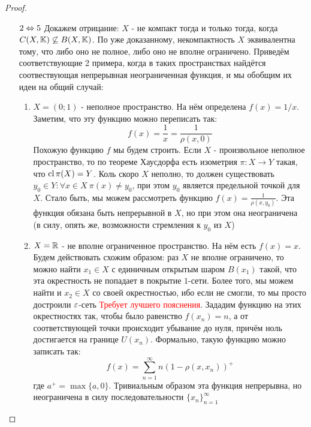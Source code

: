 \begin{proof}
\begin{enumerate}
		\item[$2 \Leftrightarrow 5$] Докажем отрицание: $X$ - не компакт тогда и только тогда, когда $C(X, \K) \centernot\subseteq B(X, \K)$. По уже доказанному, некомпактность $X$ эквивалентна тому, что либо оно не полное, либо оно не вполне ограничено. Приведём соответствующие 2 примера, когда в таких пространствах найдётся соотвествующая непрерывная неограниченная функция, и мы обобщим их идеи на общий случай:
		\begin{enumerate}
			\item $X = (0; 1)$ - неполное пространство. На нём определена $f(x) = 1 / x$. Заметим, что эту функцию можно переписать так:
			\[
				f(x) = \frac{1}{x} = \frac{1}{\rho(x, 0)}
			\]
			Похожую функцию $f$ мы будем строить. Если $X$ - произвольное неполное пространство, то по теореме Хаусдорфа есть изометрия $\pi \colon X \to Y$ такая, что $\operatorname{cl} \pi(X) = Y$. Коль скоро $X$ неполно, то должен существовать $y_0 \in Y \colon \forall x \in X\ \pi(x) \neq y_0$, при этом $y_0$ является предельной точкой для $X$. Стало быть, мы можем рассмотреть функцию $f(x) = \frac{1}{\rho(x, y_0)}$. Эта функция обязана быть непрерывной в $X$, но при этом она неограничена (в силу, опять же, возможности стремления к $y_0$ из $X$)
			
			\item $X = \mathbb{R}$ - не вполне ограниченное пространство. На нём есть $f(x) = x$. Будем действовать схожим образом: раз $X$ не вполне ограничено, то можно найти $x_1 \in X$ с единичным открытым шаром $B(x_1)$ такой, что эта окрестность не попадает в покрытие $1$-сети. Более того, мы можем найти и $x_2 \in X$ со своей окрестностью, ибо если не смогли, то мы просто достроили $\varepsilon$-сеть \textcolor{red}{Требует лучшего пояснения}. Зададим функцию на этих окрестностях так, чтобы было равенство $f(x_n) = n$, а от соответствующей точки происходит убывание до нуля, причём ноль достигается на границе $U(x_n)$. Формально, такую функцию можно записать так:
			\[
				f(x) = \sum_{n = 1}^\infty n(1 - \rho(x, x_n))^+
			\]
			где $a^+ = \max\{a, 0\}$. Тривиальным образом эта функция непрерывна, но неограничена в силу последовательности $\{x_n\}_{n = 1}^\infty$
		\end{enumerate}
	\end{enumerate}
\end{proof}
